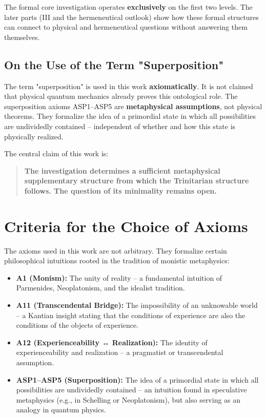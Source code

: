 \documentclass[
]{article}
\begin{document}
The formal core investigation operates \textbf{exclusively} on the first two levels. The later parts (III and the hermeneutical outlook) show how these formal structures can connect to physical and hermeneutical questions without answering them themselves.

\subsection{On the Use of the Term "Superposition"}

The term "superposition" is used in this work \textbf{axiomatically}. It is not claimed that physical quantum mechanics already proves this ontological role. The superposition axioms ASP1–ASP5 are \textbf{metaphysical assumptions}, not physical theorems. They formalize the idea of a primordial state in which all possibilities are undividedly contained – independent of whether and how this state is physically realized.

The central claim of this work is:

\begin{quote}
\textbf{The investigation determines a sufficient metaphysical supplementary structure from which the Trinitarian structure follows. The question of its minimality remains open.}
\end{quote}

\section{Criteria for the Choice of Axioms}

The axioms used in this work are not arbitrary. They formalize certain philosophical intuitions rooted in the tradition of monistic metaphysics:

\begin{itemize}
\item \textbf{A1 (Monism):} The unity of reality – a fundamental intuition of Parmenides, Neoplatonism, and the idealist tradition.
\item \textbf{A11 (Transcendental Bridge):} The impossibility of an unknowable world – a Kantian insight stating that the conditions of experience are also the conditions of the objects of experience.
\item \textbf{A12 (Experienceability ↔ Realization):} The identity of experienceability and realization – a pragmatist or transcendental assumption.
\item \textbf{ASP1–ASP5 (Superposition):} The idea of a primordial state in which all possibilities are undividedly contained – an intuition found in speculative metaphysics (e.g., in Schelling or Neoplatonism), but also serving as an analogy in quantum physics.
\end{itemize}
\end{document}
